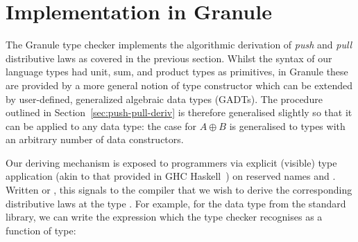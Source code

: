 
\section{Implementation in Granule}
\label{sec:implementation-der}
The Granule type checker implements the algorithmic derivation of \emph{push}
 and \emph{pull} distributive laws as covered in the previous section. Whilst the
 syntax of our language types had unit, sum, and product types as primitives, in
 Granule these are provided by a more general notion of type constructor which
 can be extended by user-defined, generalized algebraic data types (GADTs). The
 procedure outlined in Section~\ref{sec:push-pull-deriv} is therefore generalised
 slightly so that it can be applied to any data type: the case for $A \oplus B$
 is generalised to types with an arbitrary number of data constructors.
 
 Our deriving mechanism is exposed to programmers via explicit (visible) type
 application (akin to that provided in GHC Haskell~\citep{eisenberg2016visible})
 on reserved names  and . Written  or
 , this signals to the compiler that we wish to derive the
 corresponding distributive laws at the type . For example, for the
  data type from the standard library, we can write
 the expression  which the type checker recognises as a
 function of type:

